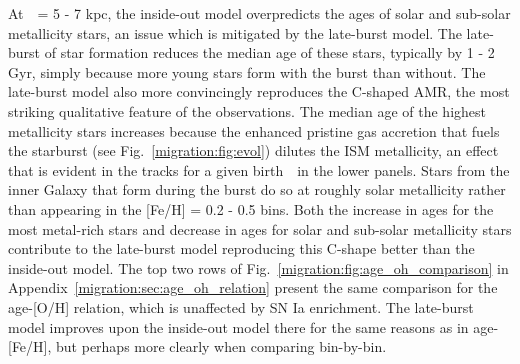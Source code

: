At~\rgal~= 5 - 7 kpc, the inside-out model overpredicts the ages of solar and 
sub-solar metallicity stars, an issue which is mitigated by the late-burst 
model. 
The late-burst of star formation reduces the median age of these stars, 
typically by 1 - 2 Gyr, simply because more young stars form with the burst 
than without. 
The late-burst model also more convincingly reproduces the C-shaped AMR, the 
most striking qualitative feature of the observations. 
The median age of the highest metallicity stars increases because the enhanced 
pristine gas accretion that fuels the starburst (see Fig.~\ref{migration:fig:evol}) 
dilutes the ISM metallicity, an effect that is evident in the tracks for a 
given birth~\rgal~in the lower panels. 
Stars from the inner Galaxy that form during the burst do so at roughly solar 
metallicity rather than appearing in the [Fe/H] = 0.2 - 0.5 bins. 
Both the increase in ages for the most metal-rich stars and decrease in ages 
for solar and sub-solar metallicity stars contribute to the late-burst model 
reproducing this C-shape better than the inside-out model. 
The top two rows of Fig.~\ref{migration:fig:age_oh_comparison} in 
Appendix~\ref{migration:sec:age_oh_relation} present the same comparison for the 
age-[O/H] relation, which is unaffected by SN Ia enrichment. 
The late-burst model improves upon the inside-out model there for the same 
reasons as in age-[Fe/H], but perhaps more clearly when comparing bin-by-bin. 
\par 
